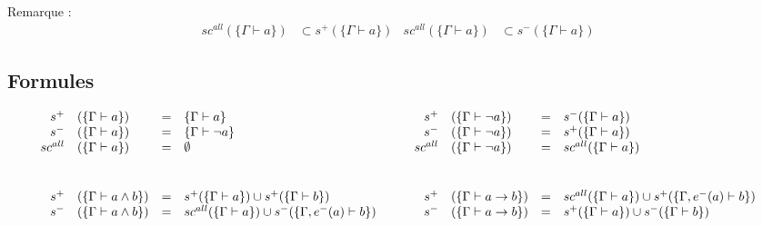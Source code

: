 \documentclass[12pt]{article}
\begin{document}
\bigskip

Remarque :
\begin{align*}
  sc^{all} (\{\Gamma \vdash a\}) & \subset s^+ (\{\Gamma \vdash a\}) & sc^{all} (\{\Gamma \vdash a\}) & \subset s^- (\{\Gamma \vdash a\})
\end{align*}

\newpage
\thispagestyle{empty}
\begin{landscape}

  \section*{Formules}
  \[
    \begin{array}{rlcl c rlcl}
      s^+      & (\{\Gamma \vdash a\})                   & = & \{\Gamma \vdash a\}
               & \quad                                   &
      s^+      & (\{\Gamma \vdash \neg a\})              & = & s^- (\{\Gamma \vdash a\})                                                                      \\

      s^-      & (\{\Gamma \vdash a\})                   & = & \{\Gamma \vdash \neg a\}
               & \quad                                   &
      s^-      & (\{\Gamma \vdash \neg a\})              & = & s^+ (\{\Gamma \vdash a\})                                                                      \\

      sc^{all} & (\{\Gamma \vdash a\})                   & = & \emptyset
               & \quad                                   &
      sc^{all} & (\{\Gamma \vdash \neg a\})              & = & sc^{all} (\{\Gamma \vdash a\})                                                                 \\
      \\[1.5em]
      s^+      & (\{\Gamma \vdash a \land b\})           & = & s^+ (\{\Gamma \vdash a\}) \cup s^+ (\{\Gamma \vdash b\})
               & \quad                                   &
      s^+      & (\{\Gamma \vdash a \rightarrow b\})     & = & sc^{all} (\{\Gamma \vdash a\}) \cup s^+ (\{\Gamma, e^- (a) \vdash b\})                         \\

      s^-      & (\{\Gamma \vdash a \land b\})           & = & sc^{all} (\{\Gamma \vdash a\}) \cup s^- (\{\Gamma, e^- (a)\vdash b\})
               & \quad                                   &
      s^-      & (\{\Gamma \vdash a \rightarrow b\})     & = & s^+ (\{\Gamma \vdash a\}) \cup s^- (\{\Gamma \vdash b\})                                       \\


\end{array}\]
\end{landscape}
\end{document}
